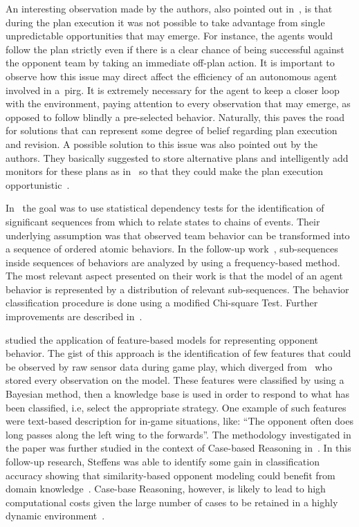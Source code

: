 An interesting observation made by the authors, also pointed out in~\cite{rofer_overview_2012}, is that during the plan execution it was not possible to take advantage from single unpredictable opportunities that may emerge. For instance, the agents would follow the plan strictly even if there is a clear chance of being successful against the opponent team by taking an immediate off-plan action. It is important to observe how this issue may direct affect the efficiency of an autonomous agent involved in a~\gls{pirg}. It is extremely necessary for the agent to keep a closer loop with the environment, paying attention to every observation that may emerge, as opposed to follow blindly a pre-selected behavior. Naturally, this paves the road for solutions that can represent some degree of belief regarding plan execution and revision. A possible solution to this issue was also pointed out by the authors. They basically suggested to store alternative plans and intelligently add monitors for these plans as in~\cite{veloso_rationale-based_1998} so that they could make the plan execution opportunistic~\citep{riley_coaching_2001,riley_planning_2002,rofer_overview_2012}.

In~\cite{iglesias_comparing_2006} the goal was to use statistical dependency tests for the identification of significant sequences from which to relate states to chains of events. Their underlying assumption was that observed team behavior can be transformed into a sequence of ordered atomic behaviors. In the follow-up work~\cite{burgard_classifying_2008}, sub-sequences inside sequences of behaviors are analyzed by using a frequency-based method. The most relevant aspect presented on their work is that the model of an agent behavior is represented by a distribution of relevant sub-sequences. The behavior classification procedure is done using a modified Chi-square Test. Further improvements are described in~\cite{iglesias_winning_2009}. %

\cite{steffens_feature-based_2003} studied the application of feature-based models for representing opponent behavior. The gist of this approach is the identification of few features that could be observed by raw sensor data during game play, which diverged from~\cite{fix_behavior_2000} who stored every observation on the model. These features were classified by using a Bayesian method, then a knowledge base is used in order to respond to what has been classified, i.e, select the appropriate strategy. One example of such features were text-based description for in-game situations, like: ``The opponent often does long passes along the left wing to the forwards''. The methodology investigated in the paper was further studied in the context of Case-based Reasoning in~\cite{steffens_similarity-based_2005}. In this follow-up research, Steffens was able to identify some gain in classification accuracy showing that similarity-based opponent modeling could benefit from domain knowledge~\citep{rofer_overview_2012}. Case-base Reasoning, however, is likely to lead to high computational costs given the large number of cases to be retained in a highly dynamic environment~\citep{ahmadi_using_2004,rofer_overview_2012}.

